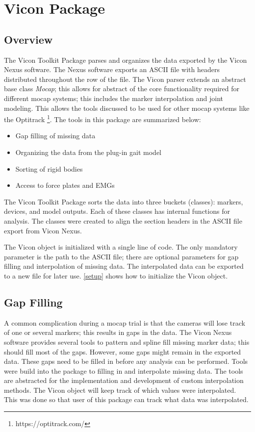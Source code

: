 \section{Vicon Package}
\subsection{Overview}
The Vicon Toolkit Package parses and organizes the data exported by the Vicon Nexus software. The Nexus software exports an ASCII file with headers distributed throughout the row of the file. The Vicon parser extends an abstract base class \textit{Mocap}; this allows for abstract of the core functionality required for different mocap systems; this includes the marker interpolation and joint modeling. This allows the tools discussed to be used for other mocap systems like the Optitrack \footnote{https://optitrack.com/}.  
 The tools in this package are summarized below: 

\begin{itemize}[noitemsep]
    \item Gap filling of missing data 
    \item Organizing the data from the plug-in gait model 
    \item Sorting of rigid bodies
    \item Access to force plates and EMGs 
\end{itemize}


The Vicon Toolkit Package sorts the data into three buckets (classes): markers, devices, and model outputs. Each of these classes has internal functions for analysis. The classes were created to align the section headers in the ASCII file export from Vicon Nexus. 

The Vicon object is initialized with a single line of code. The only mandatory parameter is the path to the ASCII file; there are optional parameters for gap filling and interpolation of missing data. The interpolated data can be exported to a new file for later use.  \autoref{setup} shows how to initialize the Vicon object.




\subsection{Gap Filling}

A common complication during a mocap trial is that the cameras will lose track of one or several markers; this results in gaps in the data. The Vicon Nexus software provides several tools to pattern and spline fill missing marker data; this should fill most of the gaps. However, some gaps might remain in the exported data. These gaps need to be filled in before any analysis can be performed. Tools were build into the package to filling in and interpolate missing data. The tools are abstracted for the implementation and development of custom interpolation methods. The Vicon object will keep track of which values were interpolated. This was done so that user of this package can track what data was interpolated. 


